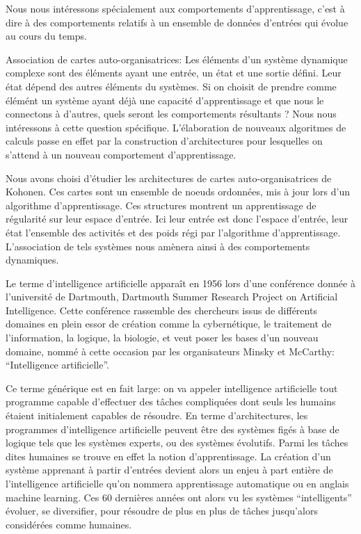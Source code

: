\documentclass[../main]{subfiles}
\begin{document}
Nous nous intéressons spécialement aux comportements d'apprentissage, c'est à dire à des comportements relatifs à un ensemble de données d'entrées qui évolue au cours du temps. 


Association de cartes auto-organisatrices:
Les éléments d'un système dynamique complexe sont des éléments ayant une entrée, un état et une sortie défini. Leur état dépend des autres éléments du systèmes.
Si on choisit de prendre comme élémént un système ayant déjà une capacité d'apprentissage et que nous le connectons à d'autres, quels seront les comportements résultants ?
Nous nous intéressons à cette question spécifique. L'élaboration de nouveaux algoritmes de calculs passe en effet par la construction d'architectures pour lesquelles on s'attend à un nouveau comportement d'apprentissage.

Nous avons choisi d'étudier les architectures de cartes auto-organisatrices de Kohonen. Ces cartes sont un ensemble de noeuds ordonnées, mis à jour lors d'un algorithme d'apprentissage. Ces structures montrent un apprentissage de régularité sur leur espace d'entrée. Ici leur entrée est donc l'espace d'entrée, leur état l'ensemble des activités et des poids régi par l'algorithme d'apprentissage.
L'association de tels systèmes nous amènera ainsi à des comportements dynamiques.

Le terme d'intelligence artificielle apparaît en 1956 lors d'une conférence donnée à l'université de Dartmouth, Dartmouth Summer Research Project on Artificial Intelligence. Cette conférence rassemble des chercheurs issus de différents domaines en plein essor de création comme la cybernétique, le traitement de l'information, la logique, la biologie, et veut poser les bases d'un nouveau domaine, nommé à cette occasion par les organisateurs Minsky et McCarthy: “Intelligence artificielle”. 

Ce terme générique est en fait large: on va appeler intelligence artificielle tout programme capable d'effectuer des tâches compliquées dont seuls les humains étaient initialement capables de résoudre. 
En terme d'architectures, les programmes d'intelligence artificielle peuvent être des systèmes figés à base de logique tels que les systèmes experts, ou des systèmes évolutifs. Parmi les tâches dites humaines se trouve en effet la notion d'apprentissage. La création  d'un système apprenant à partir d'entrées devient alors un enjeu à part entière de l'intelligence artificielle qu'on nommera apprentissage automatique ou en anglais machine learning.
Ces 60 dernières années ont alors vu les systèmes “intelligents” évoluer, se diversifier, pour résoudre de plus en plus de tâches jusqu'alors considérées comme humaines.
\end{document}

